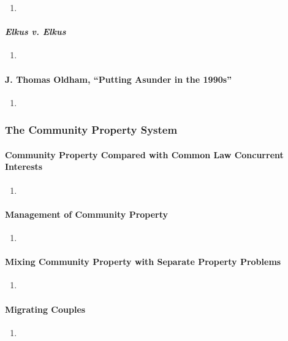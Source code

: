 \begin{enumerate}
    \item %
\end{enumerate}

\paragraph{\emph{Elkus v. Elkus}}

\begin{enumerate}
    \item %
\end{enumerate}

\paragraph{J. Thomas Oldham, ``Putting Asunder in the 1990s''}

\begin{enumerate}
    \item %
\end{enumerate}

\subsubsection{The Community Property System}


\paragraph{Community Property Compared with Common Law Concurrent Interests}

\begin{enumerate}
    \item %
\end{enumerate}

\paragraph{Management of Community Property}

\begin{enumerate}
    \item %
\end{enumerate}

\paragraph{Mixing Community Property with Separate Property Problems}

\begin{enumerate}
    \item %
\end{enumerate}

\paragraph{Migrating Couples}

\begin{enumerate}
    \item %
\end{enumerate}
